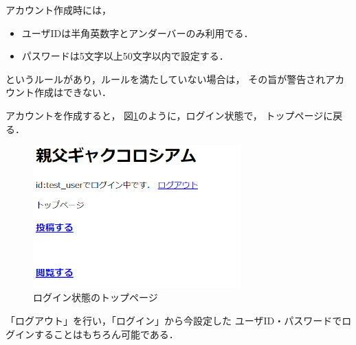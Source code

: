 \documentclass[a4paper,11pt]{jsreport}
\begin{document}
アカウント作成時には，
\begin{itemize}
  \item ユーザIDは半角英数字とアンダーバーのみ利用でる．
  \item パスワードは5文字以上50文字以内で設定する．
\end{itemize}
というルールがあり，ルールを満たしていない場合は，
その旨が警告されアカウント作成はできない．

アカウントを作成すると，
図\ref{fig:top_auth}のように，ログイン状態で，
トップページに戻る．
\begin{figure}[tb]
  \centering
  \includegraphics[width=8cm]{img/top_auth.png}
  \caption{ログイン状態のトップページ\label{fig:top_auth}}
\end{figure}

「ログアウト」を行い，「ログイン」から今設定した
ユーザID・パスワードでログインすることはもちろん可能である．
\end{document}
